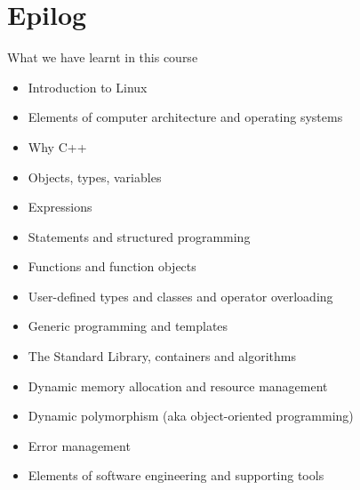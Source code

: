 

\section{Epilog}

\begin{frame}{What we have learnt in this course}
  \begin{itemize}
  \item Introduction to Linux
  \item Elements of computer architecture and operating systems
  \item Why C++
  \item Objects, types, variables
  \item Expressions
  \item Statements and structured programming
  \item Functions and function objects
  \item User-defined types and classes and operator overloading
  \item Generic programming and templates
  \item The Standard Library, containers and algorithms
  \item Dynamic memory allocation and resource management
  \item Dynamic polymorphism (aka object-oriented programming)
  \item Error management
  \item Elements of software engineering and supporting tools
  \end{itemize}
\end{frame}

